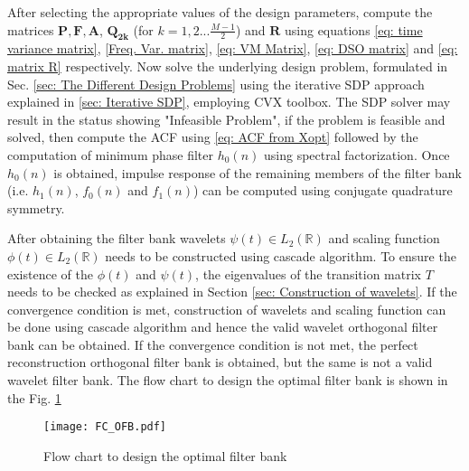 After selecting the appropriate values of the design parameters, compute the matrices $\mathbf{P,F,A}$, $\mathbf{Q_{2k}}$ (for $k=1,2...\frac{M-1}{2}$) and $\mathbf{R}$ using equations \ref{eq: time variance matrix}, \ref{Freq. Var. matrix}, \ref{eq: VM Matrix}, \ref{eq: DSO matrix} and \ref{eq: matrix R} respectively. Now solve the underlying design problem, formulated in Sec. \ref{sec: The Different Design Problems} using the iterative SDP approach explained in \ref{sec: Iterative SDP}, employing CVX toolbox. The SDP solver may result in the status showing "Infeasible Problem", if the problem is feasible and solved, then compute the ACF using \ref{eq: ACF from Xopt} followed by the computation of minimum phase filter $h_0(n)$ using spectral factorization. Once $h_0(n)$ is obtained, impulse response of the remaining members of the filter bank (i.e. $h_1(n)$, $f_0(n)$ and $f_1(n)$) can be computed using conjugate quadrature symmetry.

After obtaining the filter bank wavelets $\psi(t) \in L_2(\mathbb{R})$ and scaling function $\phi(t) \in L_2(\mathbb{R})$ needs to be constructed using cascade algorithm. To ensure the existence of the $\phi(t)$ and $\psi(t)$, the eigenvalues of the transition matrix $T$ needs to be checked as explained in Section \ref{sec: Construction of wavelets}. If the convergence condition is met, construction of wavelets and scaling function can be done using cascade algorithm and hence the valid wavelet orthogonal filter bank can be obtained. If the convergence condition is not met, the perfect reconstruction orthogonal filter bank is obtained, but the same is not a valid wavelet filter bank. The flow chart to design the optimal filter bank is shown in the Fig. \ref{fig: FC}
\begin{figure}
\texttt{[image: FC\_OFB.pdf]}
\caption{Flow chart to design the optimal filter bank}
\label{fig: FC}
\end{figure}
